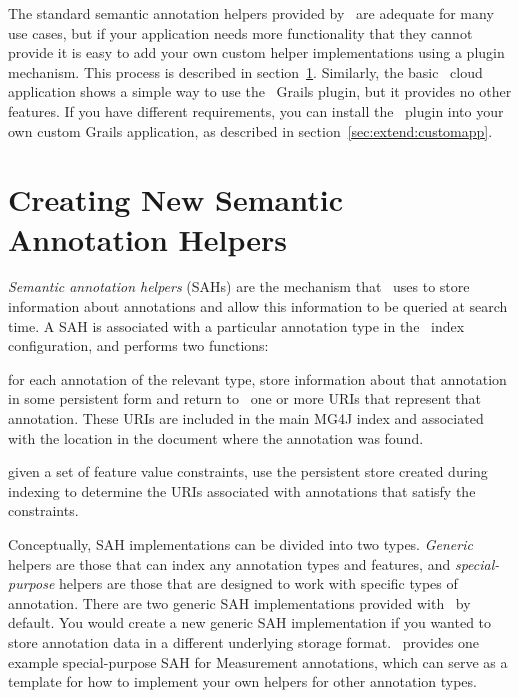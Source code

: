 The standard semantic annotation helpers provided by \Mimir\ are adequate for
many use cases, but if your application needs more functionality that they
cannot provide it is easy to add your own custom helper implementations using a
plugin mechanism.  This process is described in
section~\ref{sec:extend:helpers}.  Similarly, the basic \Mimir\ cloud
application shows a simple way to use the \Mimir\ Grails plugin, but it provides
no other features.  If you have different requirements, you can install the
\Mimir\ plugin into your own custom Grails application, as described in
section~\ref{sec:extend:customapp}.

\section{Creating New Semantic Annotation Helpers}\label{sec:extend:helpers}

{\em Semantic annotation helpers} (SAHs) are the mechanism that \Mimir\ uses to
store information about annotations and allow this information to be queried at
search time.  A SAH is associated with a particular annotation type in the
\Mimir\ index configuration, and performs two functions:

\bde
\item[During indexing] for each annotation of the relevant type, store
  information about that annotation in some persistent form and return to
  \Mimir\ one or more URIs that represent that annotation.  These URIs are
  included in the main MG4J index and associated with the location
  in the document where the annotation was found.
\item[During searching] given a set of feature value constraints, use the
  persistent store created during indexing to determine the URIs associated
  with annotations that satisfy the constraints.
\ede

Conceptually, SAH implementations can be divided into two types.
{\em Generic} helpers are those that can index any annotation types and
features, and {\em special-purpose} helpers are those that are designed to work
with specific types of annotation.  There are two generic SAH implementations
provided with \Mimir\ by default.  You would create a new generic SAH
implementation if you wanted to store annotation data in a different underlying
storage format.  \Mimir\ provides one example special-purpose SAH for
Measurement annotations, which can serve as a template for how to implement
your own helpers for other annotation types.

